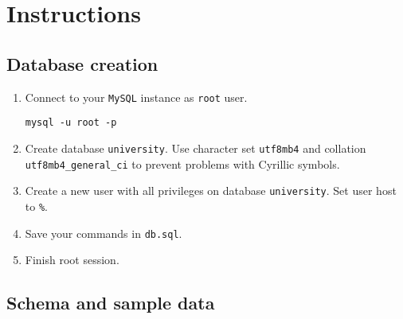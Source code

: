 \documentclass[12pt]{article}
\newcommand{\code}[1]{\texttt{#1}}
\begin{document}
\section*{Instructions}
\subsection*{Database creation}

\begin{enumerate}
\item Connect to your \code{MySQL} instance as \code{root} user.
\begin{verbatim}
mysql -u root -p
\end{verbatim}
\item Create database \code{university}. Use character set \code{utf8mb4} and collation \code{utf8mb4\_general\_ci} to prevent problems with Cyrillic symbols.
\item Create a new user with all privileges on database \code{university}. Set user host to \code{\%}.
\item Save your commands in \code{db.sql}.
\item Finish root session.
\end{enumerate}

\subsection*{Schema and sample data}
\end{document}
